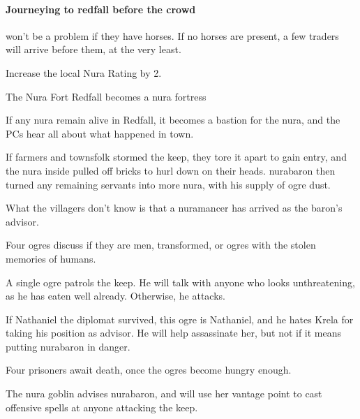 \begin{multicols}{2}
\paragraph{Journeying to \gls{redfall} before the crowd}
won't be a problem if they have horses.
If no horses are present, a few traders will arrive before them, at the very least.

Increase the local Nura Rating by 2.

{The Nura Fort}%
{Redfall becomes a nura fortress}%

If any nura remain alive in Redfall, it becomes a bastion for the nura, and the PCs hear all about what happened in \gls{town}.

If farmers and townsfolk stormed the keep, they tore it apart to gain entry, and the nura inside pulled off bricks to hurl down on their heads.
\Gls{nurabaron} then turned any remaining servants into more nura, with his supply of ogre dust.

What the villagers don't know is that a nuramancer has arrived as the baron's advisor.



Four ogres discuss if they are men, transformed, or ogres with the stolen memories of humans.



A single ogre patrols the keep.
He will talk with anyone who looks unthreatening, as he has eaten well already.
Otherwise, he attacks.

If Nathaniel the diplomat survived, this ogre is Nathaniel, and he hates Krela for taking his position as advisor.
He will help assassinate her, but not if it means putting \gls{nurabaron} in danger.



Four prisoners await death, once the ogres become hungry enough.


The nura goblin advises \gls{nurabaron}, and will use her vantage point to cast offensive spells at anyone attacking the keep.


\end{multicols}
